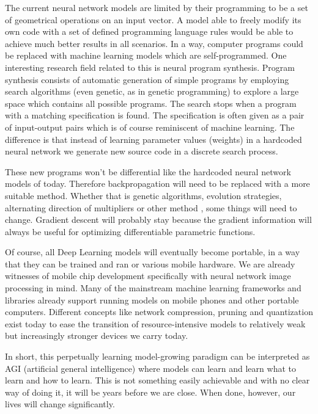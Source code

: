 \documentclass[b5paper]{book}
\let\cite\parencite
\begin{document}
The current neural network models are limited by their programming to be a set of geometrical operations on an input vector. A model able to freely modify its own code with a set of defined programming language rules would be able to achieve much better results in all scenarios. In a way, computer programs could be replaced with machine learning models which are self-programmed. One interesting research field related to this is neural program synthesis. \cite{bunel2018leveraging} Program synthesis consists of automatic generation of simple programs by employing search algorithms (even genetic, as in genetic programming) to explore a large space which contains all possible programs. The search stops when a program with a matching specification is found. The specification is often given as a pair of input-output pairs which is of course reminiscent of machine learning. The difference is that instead of learning parameter values (weights) in a hardcoded neural network we generate new source code in a discrete search process. 

These new programs won't be differential like the hardcoded neural network models of today. Therefore backpropagation will need to be replaced with a more suitable method. Whether that is genetic algorithms, evolution strategies, alternating direction of multipliers \cite{wahlberg2012admm} or other method \cite{jakovetic2014fast}, some things will need to change. Gradient descent will probably stay because the gradient information will always be useful for optimizing differentiable parametric functions.

Of course, all Deep Learning models will eventually become portable, in a way that they can be trained and ran or various mobile hardware. We are already witnesses of mobile chip development specifically with neural network image processing in mind. Many of the mainstream machine learning frameworks and libraries already support running models on mobile phones and other portable computers. Different concepts like network compression, pruning and quantization \cite{choi2016towards} exist today to ease the transition of resource-intensive models to relatively weak but increasingly stronger devices we carry today.

In short, this perpetually learning model-growing paradigm can be interpreted as AGI (artificial general intelligence) where models can learn and learn what to learn and how to learn. This is not something easily achievable and with no clear way of doing it, it will be years before we are close. When done, however, our lives will change significantly.
\end{document}
